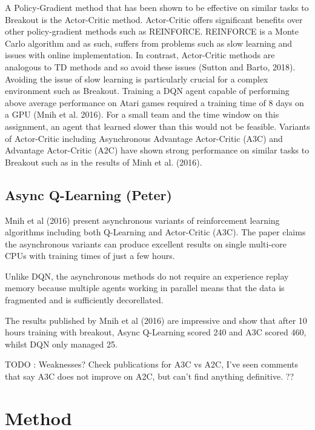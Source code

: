 \documentclass{article}
\begin{document}
A Policy-Gradient method that has been shown to be effective on similar tasks to Breakout is the Actor-Critic method. Actor-Critic offers significant benefits over other policy-gradient methods such as REINFORCE. REINFORCE is a Monte Carlo algorithm and as such, suffers from problems such as slow learning and issues with online implementation. In contrast, Actor-Critic methods are analogous to TD methods and so avoid these issues (Sutton and Barto, 2018). Avoiding the issue of slow learning is particularly crucial for a complex environment such as Breakout. Training a DQN agent capable of performing above average performance on Atari games required a training time of 8 days on a GPU (Mnih et al. 2016). For a small team and the time window on this assignment, an agent that learned slower than this would not be feasible. Variants of Actor-Critic including Asynchronous Advantage Actor-Critic (A3C) and Advantage Actor-Critic (A2C) have shown strong performance on similar tasks to Breakout such as in the results of Minh et al. (2016).

\subsection{Async Q-Learning (Peter)}

Mnih et al (2016) present asynchronous variants of reinforcement learning algorithms including both Q-Learning and Actor-Critic (A3C).
The paper claims the asynchronous variants can produce excellent results on single multi-core CPUs with training times of just a few hours.

Unlike DQN, the asynchronous methods do not require an experience replay memory because multiple agents working in parallel means that the data is fragmented and is sufficiently decorellated.

The results published by Mnih et al (2016) are impressive and show that after 10 hours training with breakout, Async Q-Learning scored 240 and A3C scored 460, whilst DQN only managed 25.

TODO : Weaknesses? Check publications for A3C vs A2C, I've seen comments that say A3C does not improve on A2C, but can't find anything definitive. ??


\section{Method}
\end{document}

